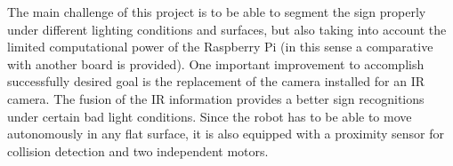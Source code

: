 The main challenge of this project is to be able to segment the sign properly under different lighting conditions and surfaces, but also taking into account the limited computational power of the Raspberry Pi (in this sense a comparative with another board is provided). One important improvement to accomplish successfully desired goal is the replacement of the camera installed for an IR camera. The fusion of the IR information provides a better sign recognitions under certain bad light conditions. Since the robot has to be able to move autonomously in any flat surface, it is also equipped with a proximity sensor for collision detection and two independent motors.